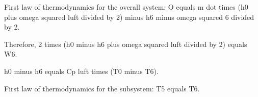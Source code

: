 First law of thermodynamics for the overall system:
O equals m dot times (h0 plus omega squared luft divided by 2) minus h6 minus omega squared 6 divided by 2.

Therefore, 2 times (h0 minus h6 plus omega squared luft divided by 2) equals W6.

h0 minus h6 equals Cp luft times (T0 minus T6).

First law of thermodynamics for the subsystem:
T5 equals T6.